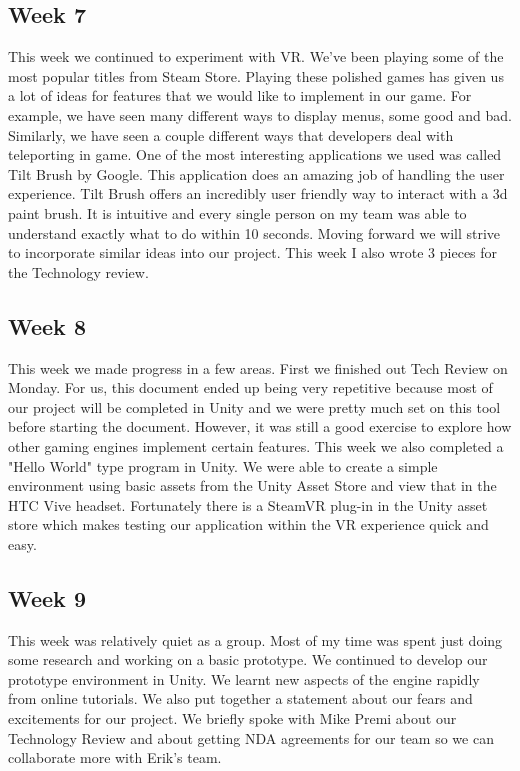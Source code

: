 \documentclass[10pt,journal,compsoc,onecolumn, draftclsnofoot]{IEEEtran}
\begin{document}
\subsection{Week 7}
This week we continued to experiment with VR. We've been playing some of the most popular titles from Steam Store.
Playing these polished games has given us a lot of ideas for features that we would like to implement in our game.
For example, we have seen many different ways to display menus, some good and bad.
Similarly, we have seen a couple different ways that developers deal with teleporting in game.
One of the most interesting applications we used was called Tilt Brush by Google.
This application does an amazing job of handling the user experience.
Tilt Brush offers an incredibly user friendly way to interact with a 3d paint brush.
It is intuitive and every single person on my team was able to understand exactly what to do within 10 seconds.
Moving forward we will strive to incorporate similar ideas into our project.
This week I also wrote 3 pieces for the Technology review.

\subsection{Week 8}
This week we made progress in a few areas. First we finished out Tech Review on Monday.
For us, this document ended up being very repetitive because most of our project will be completed in Unity and we were pretty much set on this tool before starting the document.
However, it was still a good exercise to explore how other gaming engines implement certain features.
This week we also completed a "Hello World" type program in Unity.
We were able to create a simple environment using basic assets from the Unity Asset Store and view that in the HTC Vive headset.
Fortunately there is a SteamVR plug-in in the Unity asset store which makes testing our application within the VR experience quick and easy.

\subsection{Week 9}
This week was relatively quiet as a group.
Most of my time was spent just doing some research and working on a basic prototype.
We continued to develop our prototype environment in Unity.
We learnt new aspects of the engine rapidly from online tutorials.
We also put together a statement about our fears and excitements for our project.
We briefly spoke with Mike Premi about our Technology Review and about getting NDA agreements for our team so we can collaborate more with Erik's team.
\end{document}
